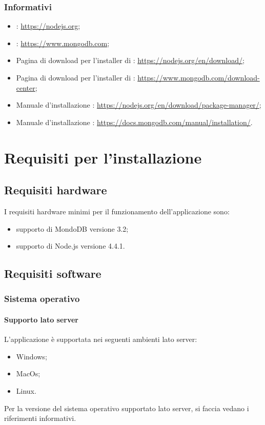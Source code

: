\documentclass[12pt,a4paper]{article}
\begin{document}
	\subsubsection{Informativi}
	\begin{itemize}
		\item {}: \url{https://nodejs.org};
		\item {}: \url{https://www.mongodb.com};
		\item Pagina di download per l'installer di :
		\url{https://nodejs.org/en/download/};
		\item Pagina di download per l'installer di :
		\url{https://www.mongodb.com/download-center};
		\item Manuale d'installazione :
		\url{https://nodejs.org/en/download/package-manager/};
		\item Manuale d'installazione :
		\url{https://docs.mongodb.com/manual/installation/}.
		
	\end{itemize}	
	
	\newpage
	\section{Requisiti per l'installazione}\label{requisiti}
	\subsection{Requisiti hardware}\label{requisitiHW}
	I requisiti hardware minimi per il funzionamento dell'applicazione sono:
	\begin{itemize}
		\item supporto di MondoDB versione 3.2;
		\item supporto di Node.js versione 4.4.1.
	\end{itemize}
	\subsection{Requisiti software}\label{requisitiSW}
	\subsubsection{Sistema operativo}
	\paragraph{Supporto lato server}L'applicazione \prj{} è supportata nei seguenti ambienti lato server:
	\begin{itemize}
		\item Windows;
		\item MacOs;
		\item Linux.
	\end{itemize}
	Per la versione del sistema operativo supportato lato server, si faccia vedano i  riferimenti informativi.
\end{document}
